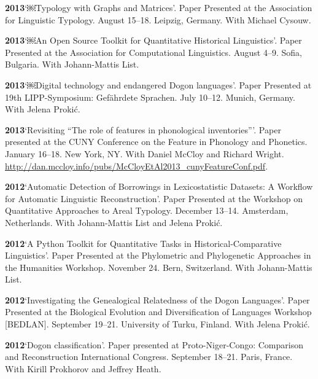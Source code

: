 \documentclass[11pt]{article}
\newcommand{\hangpara}{
 \setlength{\parindent}{0in} %
 \hangindent=0.42in %
}
\begin{document}
\vskip 6pt
\hangpara
{\bf 2013}\hspace{1ex}`￼Typology with Graphs and Matrices'. Paper Presented at the Association for Linguistic Typology. August 15--18. Leipzig, Germany. With Michael Cysouw.

\vskip 6pt
\hangpara
{\bf 2013}\hspace{1ex}`￼An Open Source Toolkit for Quantitative Historical Linguistics'. Paper Presented at the Association for Computational Linguistics. August 4--9. Sofia, Bulgaria. With Johann-Mattis List.

\vskip 6pt
\hangpara
{\bf 2013}\hspace{1ex}`￼Digital technology and endangered Dogon languages'. Paper Presented at 19th LIPP-Symposium: Gef{\"a}hrdete Sprachen. July 10--12. Munich, Germany. With Jelena Proki{\'c}.

\vskip 6pt
\hangpara
{\bf 2013}\hspace{1ex}`Revisiting ``The role of features in phonological inventories'''. Paper presented at the CUNY Conference on the Feature in Phonology and Phonetics. January 16--18. New York, NY. With Daniel McCloy and Richard Wright. \url{http://dan.mccloy.info/pubs/McCloyEtAl2013_cunyFeatureConf.pdf}.

\vskip 6pt
\hangpara
{\bf 2012}\hspace{1ex}`Automatic Detection of Borrowings in Lexicostatistic Datasets: A Workflow for Automatic Linguistic Reconstruction'. Paper Presented at the Workshop on Quantitative Approaches to Areal Typology. December 13--14. Amsterdam, Netherlands. With Johann-Mattis List and Jelena Proki{\'c}.

\vskip 6pt
\hangpara
{\bf 2012}\hspace{1ex}`A Python Toolkit for Quantitative Tasks in Historical-Comparative Linguistics'. Paper Presented at the Phylometric and Phylogenetic Approaches in the Humanities Workshop. November 24. Bern, Switzerland. With Johann-Mattis List.

\vskip 6pt
\hangpara
{\bf 2012}\hspace{1ex}`Investigating the Genealogical Relatedness of the Dogon Languages'. Paper Presented at the Biological Evolution and Diversification of Languages Workshop [BEDLAN]. September 19--21. University of Turku, Finland. With Jelena Proki{\'c}.

\vskip 6pt
\hangpara
{\bf 2012}\hspace{1ex}`Dogon classification'. Paper presented at Proto-Niger-Congo: Comparison and Reconstruction International Congress. September 18--21. Paris, France. With Kirill Prokhorov and Jeffrey Heath.
\end{document}
